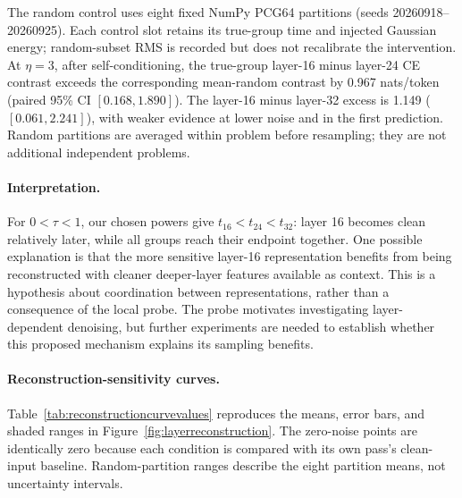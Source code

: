 \documentclass{article}
\begin{document}
The random control uses eight fixed NumPy PCG64 partitions (seeds 20260918--20260925). Each control slot retains its true-group time and injected Gaussian energy; random-subset RMS is recorded but does not recalibrate the intervention. At $\eta=3$, after self-conditioning, the true-group layer-16 minus layer-24 CE contrast exceeds the corresponding mean-random contrast by 0.967 nats/token (paired 95\% CI $[0.168,1.890]$). The layer-16 minus layer-32 excess is 1.149 ($[0.061,2.241]$), with weaker evidence at lower noise and in the first prediction. Random partitions are averaged within problem before resampling; they are not additional independent problems.

\paragraph{Interpretation.}
For $0<\tau<1$, our chosen powers give $t_{16}<t_{24}<t_{32}$: layer 16 becomes clean relatively later, while all groups reach their endpoint together. One possible explanation is that the more sensitive layer-16 representation benefits from being reconstructed with cleaner deeper-layer features available as context. This is a hypothesis about coordination between representations, rather than a consequence of the local probe. The probe motivates investigating layer-dependent denoising, but further experiments are needed to establish whether this proposed mechanism explains its sampling benefits.

\paragraph{Reconstruction-sensitivity curves.}
Table~\ref{tab:reconstructioncurvevalues} reproduces the means, error bars, and shaded ranges in Figure~\ref{fig:layerreconstruction}. The zero-noise points are identically zero because each condition is compared with its own pass's clean-input baseline. Random-partition ranges describe the eight partition means, not uncertainty intervals.
\end{document}

